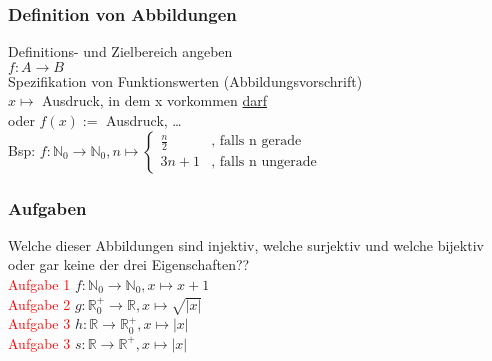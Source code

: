 \documentclass{beamer}
\begin{document}
	\begin{frame}
		\frametitle{Definition von Abbildungen}
		Definitions- und Zielbereich angeben\\
		$f: A\longrightarrow B$\\
		Spezifikation von Funktionswerten (Abbildungsvorschrift)\\
		$x\mapsto$ Ausdruck, in dem x vorkommen \underline{darf}\\
		oder $f(x) :=$ Ausdruck, \dots\\
		Bsp: $f: \mathbb{N}_0\longrightarrow\mathbb{N}_0, n\mapsto
		\begin{cases}
			\frac{n}{2} & \text{, falls n gerade}\\
			3n+1 & \text{, falls n ungerade}
		\end{cases}$
	\end{frame}
	\begin{frame}
		\frametitle{Aufgaben}
		Welche dieser Abbildungen sind injektiv, welche surjektiv und welche bijektiv oder gar keine der drei Eigenschaften??\\
		\textcolor{red}{Aufgabe 1} $f:\mathbb{N}_0\longrightarrow\mathbb{N}_0, x\mapsto x+1$\\
		\textcolor{red}{Aufgabe 2} $g:\mathbb{R}_0^+\longrightarrow\mathbb{R}, x\mapsto\sqrt{\lvert x\rvert}$\\
		\textcolor{red}{Aufgabe 3} $h:\mathbb{R}\longrightarrow\mathbb{R}_0^+, x\mapsto\lvert x\rvert$\\
		\textcolor{red}{Aufgabe 3} $s:\mathbb{R}\longrightarrow\mathbb{R}^+, x\mapsto\lvert x\rvert$
	\end{frame}
\end{document}
